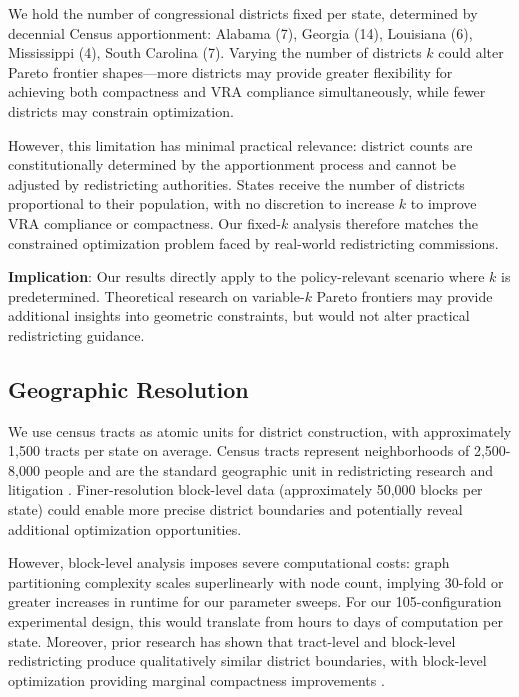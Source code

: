 We hold the number of congressional districts fixed per state, determined by decennial Census apportionment: Alabama (7), Georgia (14), Louisiana (6), Mississippi (4), South Carolina (7). Varying the number of districts $k$ could alter Pareto frontier shapes---more districts may provide greater flexibility for achieving both compactness and VRA compliance simultaneously, while fewer districts may constrain optimization.

However, this limitation has minimal practical relevance: district counts are constitutionally determined by the apportionment process and cannot be adjusted by redistricting authorities. States receive the number of districts proportional to their population, with no discretion to increase $k$ to improve VRA compliance or compactness. Our fixed-$k$ analysis therefore matches the constrained optimization problem faced by real-world redistricting commissions.

\textbf{Implication}: Our results directly apply to the policy-relevant scenario where $k$ is predetermined. Theoretical research on variable-$k$ Pareto frontiers may provide additional insights into geometric constraints, but would not alter practical redistricting guidance.

\subsection{Geographic Resolution}

We use census tracts as atomic units for district construction, with approximately 1,500 tracts per state on average. Census tracts represent neighborhoods of 2,500-8,000 people and are the standard geographic unit in redistricting research and litigation \citep{altman1998}. Finer-resolution block-level data (approximately 50,000 blocks per state) could enable more precise district boundaries and potentially reveal additional optimization opportunities.

However, block-level analysis imposes severe computational costs: graph partitioning complexity scales superlinearly with node count, implying 30-fold or greater increases in runtime for our parameter sweeps. For our 105-configuration experimental design, this would translate from hours to days of computation per state. Moreover, prior research has shown that tract-level and block-level redistricting produce qualitatively similar district boundaries, with block-level optimization providing marginal compactness improvements \citep{ricca2013}.

